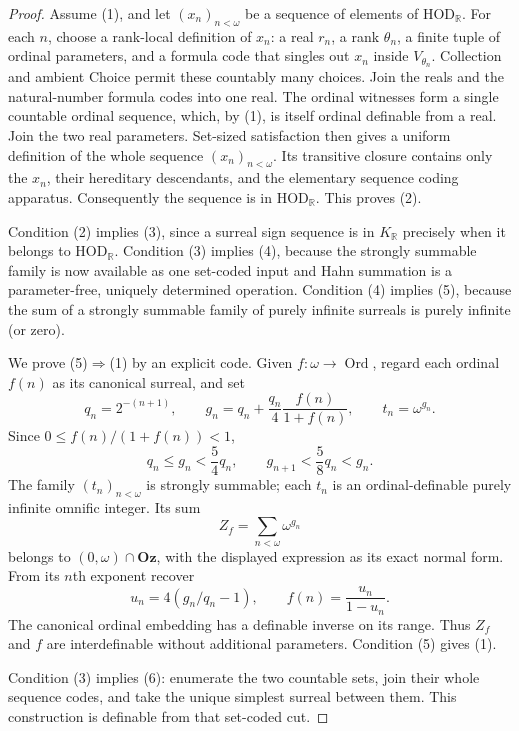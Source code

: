 \documentclass[11pt,a4paper]{article}
\numberwithin{equation}{section}
\theoremstyle{definition}
\theoremstyle{remark}
\newcommand{\Oz}{\mathbf{Oz}}
\newcommand{\HOD}{\mathrm{HOD}}
\newcommand{\R}{\mathbb R}
\newcommand{\HR}{\HOD_{\R}}
\newcommand{\KR}{K_{\R}}
\begin{document}
\begin{proof}
Assume (1), and let $(x_n)_{n<\omega}$ be a sequence of elements of
$\HR$.  For each $n$, choose a rank-local
definition of $x_n$: a real $r_n$, a rank $\theta_n$, a finite tuple
of ordinal parameters, and a formula code that singles out $x_n$
inside $V_{\theta_n}$.  Collection and ambient Choice permit these
countably many choices.  Join the reals and the natural-number formula codes into one
real.  The ordinal witnesses form a single countable ordinal sequence,
which, by (1), is itself ordinal definable from a real.  Join the two
real parameters.  Set-sized satisfaction then gives a uniform definition
of the whole sequence $(x_n)_{n<\omega}$.  Its transitive closure contains
only the $x_n$, their hereditary descendants, and the elementary sequence
coding apparatus.  Consequently the sequence is in
$\HR$.  This proves (2).

Condition (2) implies (3), since a surreal sign sequence is in
$\KR$ precisely when it belongs to
$\HR$.  Condition (3) implies (4), because
the strongly summable family is now available as one set-coded input
and Hahn summation is a parameter-free, uniquely determined operation.
Condition (4) implies (5), because the sum of a strongly summable
family of purely infinite surreals is purely infinite (or zero).

We prove (5)$\Rightarrow$(1) by an explicit code.  Given
$f:\omega\to\operatorname{Ord}$, regard each ordinal $f(n)$ as its
canonical surreal, and set
\[
 q_n=2^{-(n+1)},\qquad
 g_n=q_n+\frac{q_n}{4}\frac{f(n)}{1+f(n)},\qquad
 t_n=\omega^{g_n}.
\]
Since $0\le f(n)/(1+f(n))<1$,
\[
 q_n\le g_n<\frac54q_n,\qquad
 g_{n+1}<\frac58q_n<g_n.
\]
The family $(t_n)_{n<\omega}$ is strongly summable; each $t_n$ is an
ordinal-definable purely infinite omnific integer.  Its sum
\begin{equation}\label{dsn:rp:eq:ordinal-sequence-code}
 Z_f=\sum_{n<\omega}\omega^{g_n}
\end{equation}
belongs to $(0,\omega)\cap\Oz$, with the displayed expression
as its exact normal form.  From its $n$th exponent recover
\[
 u_n=4(g_n/q_n-1),\qquad f(n)=\frac{u_n}{1-u_n}.
\]
The canonical ordinal embedding has a definable inverse on its range.
Thus $Z_f$ and $f$ are interdefinable without additional parameters.
Condition (5) gives (1).

Condition (3) implies (6): enumerate the two countable sets, join their
whole sequence codes, and take the unique simplest surreal between
them.  This construction is definable from that set-coded cut.


\end{proof}
\end{document}
